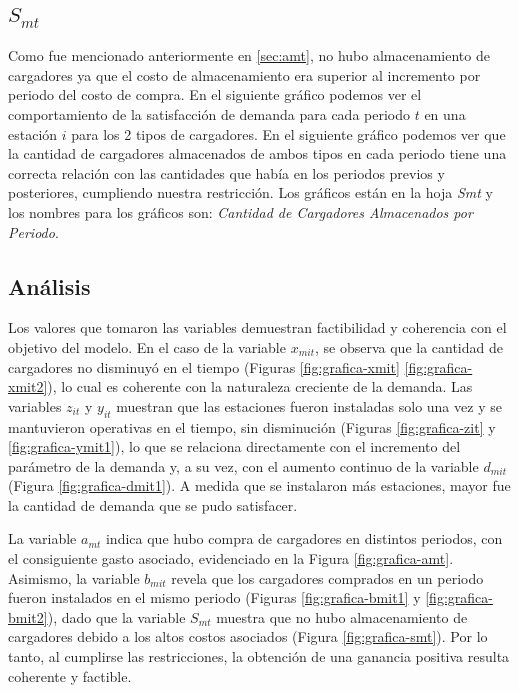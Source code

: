 \documentclass[letterpaper]{article}
\begin{document}
\begin{flushleft}
	\subsection{$S_{mt}$}

	Como fue mencionado anteriormente en \ref{sec:amt}, no hubo almacenamiento de cargadores ya que el costo de almacenamiento era superior al incremento por periodo del costo de compra. En el siguiente gráfico podemos ver el comportamiento de la satisfacción de demanda para cada periodo $t$ en una estación $i$ para los 2 tipos de cargadores. En el siguiente gráfico podemos ver que la cantidad de cargadores almacenados de ambos tipos en cada periodo tiene una correcta relación con las cantidades que había en los periodos previos y posteriores, cumpliendo nuestra restricción. Los gráficos están en la hoja \textit{Smt} y los nombres para los gráficos son: \textit{Cantidad de Cargadores Almacenados por Periodo}.


	\subsection{Análisis}

	Los valores que tomaron las variables demuestran factibilidad y coherencia con el objetivo del modelo. En el caso de la variable \(x_{mit}\), se observa que la cantidad de cargadores no disminuyó en el tiempo (Figuras \ref{fig:grafica-xmit} \ref{fig:grafica-xmit2}), lo cual es coherente con la naturaleza creciente de la demanda. Las variables \(z_{it}\) y \(y_{it}\) muestran que las estaciones fueron instaladas solo una vez y se mantuvieron operativas en el tiempo, sin disminución (Figuras \ref{fig:grafica-zit} y \ref{fig:grafica-ymit1}), lo que se relaciona directamente con el incremento del parámetro de la demanda y, a su vez, con el aumento continuo de la variable \(d_{mit}\) (Figura \ref{fig:grafica-dmit1}). A medida que se instalaron más estaciones, mayor fue la cantidad de demanda que se pudo satisfacer.
	
	La variable \(a_{mt}\) indica que hubo compra de cargadores en distintos periodos, con el consiguiente gasto asociado, evidenciado en la Figura \ref{fig:grafica-amt}. Asimismo, la variable \(b_{mit}\) revela que los cargadores comprados en un periodo fueron instalados en el mismo periodo (Figuras \ref{fig:grafica-bmit1} y \ref{fig:grafica-bmit2}), dado que la variable \(S_{mt}\) muestra que no hubo almacenamiento de cargadores debido a los altos costos asociados (Figura \ref{fig:grafica-smt}). Por lo tanto, al cumplirse las restricciones, la obtención de una ganancia positiva resulta coherente y factible.
	\newpage

\end{flushleft}
\end{document}
